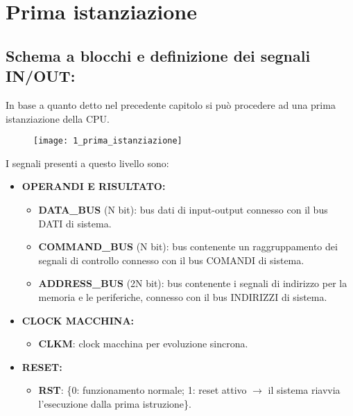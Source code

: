 \chapter{Prima istanziazione}
\section{Schema a blocchi e definizione dei segnali IN/OUT:}
In base a quanto detto nel precedente capitolo si può procedere ad una prima istanziazione della CPU.
\begin{figure}[H]
	\centering
	\texttt{[image: 1\_prima\_istanziazione]}
	\label{fig:prima_istanziazione}
\end{figure}
I segnali presenti a questo livello sono:
\begin{itemize}
	\item \textbf{OPERANDI E RISULTATO:}
	\begin{itemize}
		\item \textbf{DATA\_BUS} (N bit): bus dati di input-output connesso con il bus DATI di sistema.
		\item \textbf{COMMAND\_BUS} (N bit): bus contenente un raggruppamento dei segnali di controllo connesso con il bus COMANDI di sistema.
		\item \textbf{ADDRESS\_BUS} (2N bit): bus contenente i segnali di indirizzo per la memoria e le periferiche, connesso con il bus INDIRIZZI di sistema.
	\end{itemize}
	
	\item \textbf{CLOCK MACCHINA:}
	\begin{itemize}
		\item \textbf{CLKM}: clock macchina per evoluzione sincrona.
	\end{itemize}
	
	\item \textbf{RESET:}
	\begin{itemize}
		\item \textbf{RST}: \{0: funzionamento normale; 1: reset attivo $\rightarrow$ il sistema riavvia l'esecuzione dalla prima istruzione\}.
	\end{itemize}
\end{itemize}

